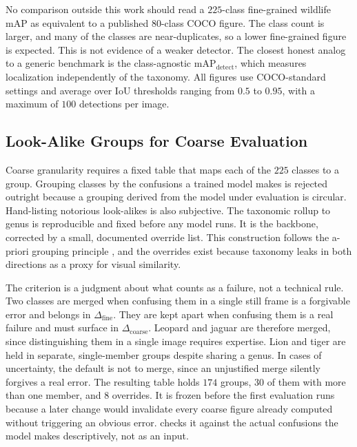 No comparison outside this work should read a $225$-class fine-grained wildlife mAP as equivalent to a published $80$-class COCO figure. The class count is larger, and many of the classes are near-duplicates, so a lower fine-grained figure is expected. This is not evidence of a weaker detector. The closest honest analog to a generic benchmark is the class-agnostic $\mathrm{mAP}_{\text{detect}}$, which measures localization independently of the taxonomy. All figures use COCO-standard settings and average over IoU thresholds ranging from $0.5$ to $0.95$, with a maximum of $100$ detections per image.

\subsection{Look-Alike Groups for Coarse Evaluation}\label{sec:lookalike_groups}

Coarse granularity requires a fixed table that maps each of the $225$ classes to a group. Grouping classes by the confusions a trained model makes is rejected outright because a grouping derived from the model under evaluation is circular. Hand-listing notorious look-alikes is also subjective. The taxonomic rollup to genus is reproducible and fixed before any model runs. It is the backbone, corrected by a small, documented override list. This construction follows the a-priori grouping principle \cite{hoiemDiagnosingErrorObject2012}, and the overrides exist because taxonomy leaks in both directions as a proxy for visual similarity.

The criterion is a judgment about what counts as a failure, not a technical rule. Two classes are merged when confusing them in a single still frame is a forgivable error and belongs in $\Delta_{\text{fine}}$. They are kept apart when confusing them is a real failure and must surface in $\Delta_{\text{coarse}}$. Leopard and jaguar are therefore merged, since distinguishing them in a single image requires expertise. Lion and tiger are held in separate, single-member groups despite sharing a genus. In cases of uncertainty, the default is not to merge, since an unjustified merge silently forgives a real error. The resulting table holds $174$ groups, $30$ of them with more than one member, and $8$ overrides.  %
It is frozen before the first evaluation runs because a later change would invalidate every coarse figure already computed without triggering an obvious error.  checks it against the actual confusions the model makes descriptively, not as an input.


